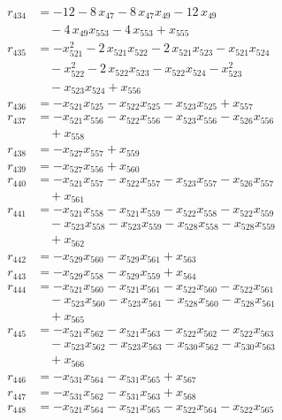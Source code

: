 \begin{align*}
r_{434} &= -12 - 8\,x_{47} - 8\,x_{47} x_{49} - 12\,x_{49} \\
&\quad{}- 4\,x_{49} x_{553} - 4\,x_{553} + x_{555} \\
r_{435} &= -x_{521}^{2} - 2\,x_{521} x_{522} - 2\,x_{521} x_{523} - x_{521} x_{524} \\
&\quad{}- x_{522}^{2} - 2\,x_{522} x_{523} - x_{522} x_{524} - x_{523}^{2} \\
&\quad{}- x_{523} x_{524} + x_{556} \\
r_{436} &= -x_{521} x_{525} - x_{522} x_{525} - x_{523} x_{525} + x_{557} \\
r_{437} &= -x_{521} x_{556} - x_{522} x_{556} - x_{523} x_{556} - x_{526} x_{556} \\
&\quad{}+ x_{558} \\
r_{438} &= -x_{527} x_{557} + x_{559} \\
r_{439} &= -x_{527} x_{556} + x_{560} \\
r_{440} &= -x_{521} x_{557} - x_{522} x_{557} - x_{523} x_{557} - x_{526} x_{557} \\
&\quad{}+ x_{561} \\
r_{441} &= -x_{521} x_{558} - x_{521} x_{559} - x_{522} x_{558} - x_{522} x_{559} \\
&\quad{}- x_{523} x_{558} - x_{523} x_{559} - x_{528} x_{558} - x_{528} x_{559} \\
&\quad{}+ x_{562} \\
r_{442} &= -x_{529} x_{560} - x_{529} x_{561} + x_{563} \\
r_{443} &= -x_{529} x_{558} - x_{529} x_{559} + x_{564} \\
r_{444} &= -x_{521} x_{560} - x_{521} x_{561} - x_{522} x_{560} - x_{522} x_{561} \\
&\quad{}- x_{523} x_{560} - x_{523} x_{561} - x_{528} x_{560} - x_{528} x_{561} \\
&\quad{}+ x_{565} \\
r_{445} &= -x_{521} x_{562} - x_{521} x_{563} - x_{522} x_{562} - x_{522} x_{563} \\
&\quad{}- x_{523} x_{562} - x_{523} x_{563} - x_{530} x_{562} - x_{530} x_{563} \\
&\quad{}+ x_{566} \\
r_{446} &= -x_{531} x_{564} - x_{531} x_{565} + x_{567} \\
r_{447} &= -x_{531} x_{562} - x_{531} x_{563} + x_{568} \\
r_{448} &= -x_{521} x_{564} - x_{521} x_{565} - x_{522} x_{564} - x_{522} x_{565} \\

\end{align*}
